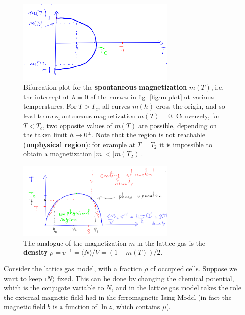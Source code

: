 \documentclass[../template.tex]{subfiles}
\begin{document}
\begin{figure}[H]
    \centering
    \includegraphics[width=0.7\textwidth]{image020.png}
    \caption{Bifurcation plot for the \textbf{spontaneous magnetization} $m(T)$, i.e. the intercept at $h=0$ of the curves in fig. \ref{fig:m-plot} at various temperatures. For $T > T_c$, all curves $m(h)$ cross the origin, and so lead to no spontaneous magnetization $m(T) = 0$. Conversely, for $T < T_c$, two opposite values of $m(T)$ are possible, depending on the taken limit $h \to 0^\pm$. Note that the region  is not reachable (\textbf{unphysical region}): for example at $T = T_2$ it is impossible to obtain a magnetization $|m| < |m(T_2)|$. \label{fig:spont-m}}
\end{figure}



\begin{figure}[H]
    \centering
    \includegraphics[width=0.7\textwidth]{image021.png}
    \caption{The analogue of the magnetization $m$ in the lattice gas is the \textbf{density} $\rho = v^{-1} = \langle N \rangle /V = (1+m(T))/2$. \label{fig:lattice-critical}} %
\end{figure}

Consider the lattice gas model, with a fraction $\rho$ of occupied cells. Suppose we want to keep $\langle N \rangle$ fixed. This can be done by changing the chemical potential, which is the conjugate variable to $N$, and in the lattice gas model takes the role the external magnetic field had in the ferromagnetic Ising Model (in fact the magnetic field $b$ is a function of $\ln z$, which contains $\mu$).
\end{document}

